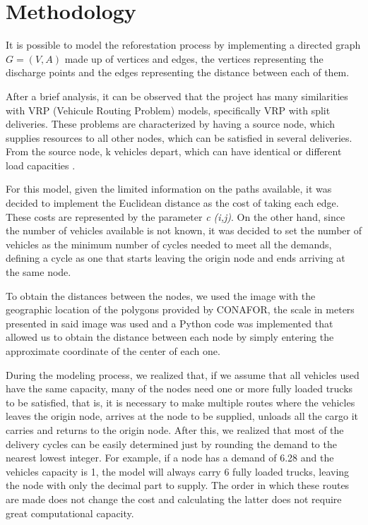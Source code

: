 \documentclass{amsart}
\begin{document}
        
        

    \section{Methodology}
        It is possible to model the reforestation process by implementing a directed graph $G=(V,A)$ made up of vertices and edges, the vertices representing the discharge points and the edges representing the distance between each of them.

        After a brief analysis, it can be observed that the project has many similarities with VRP (Vehicule Routing Problem) models, specifically VRP with split deliveries. These problems are characterized by having a source node, which supplies resources to all other nodes, which can be satisfied in several deliveries. From the source node, k vehicles depart, which can have identical or different load capacities \parencite{Dror}.

        For this model, given the limited information on the paths available, it was decided to implement the Euclidean distance as the cost of taking each edge. These costs are represented by the parameter \textit{c (i,j)}. On the other hand, since the number of vehicles available is not known, it was decided to set the number of vehicles as the minimum number of cycles needed to meet all the demands, defining a cycle as one that starts leaving the origin node and ends arriving at the same node. 

        To obtain the distances between the nodes, we used the image with the geographic location of the polygons provided by CONAFOR, the scale in meters presented in said image was used and a Python code was implemented that allowed us to obtain the distance between each node by simply entering the approximate coordinate of the center of each one.
        
        During the modeling process, we realized that, if we assume that all vehicles used have the same capacity, many of the nodes need one or more fully loaded trucks to be satisfied, that is, it is necessary to make multiple routes where the vehicles leaves the origin node, arrives at the node to be supplied, unloads all the cargo it carries and returns to the origin node. After this, we realized that most of the delivery cycles can be easily determined just by rounding the demand to the nearest lowest integer. For example, if a node has a demand of 6.28 and the vehicles capacity is 1, the model will always carry 6 fully loaded trucks, leaving the node with only the decimal part to supply. The order in which these routes are made does not change the cost and calculating the latter does not require great computational capacity.
\end{document}
